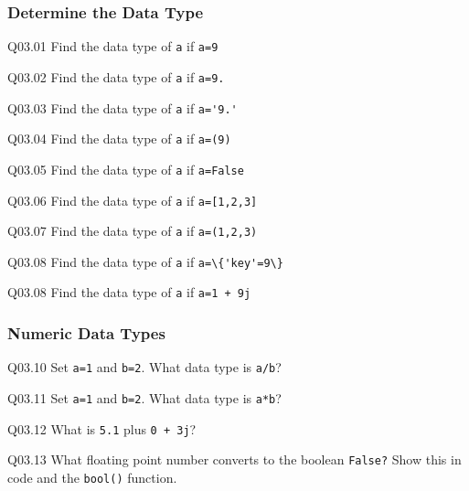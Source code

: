 \documentclass{book}
\newenvironment{problems}{}{}  %
\newcommand{\passthrough}[1]{#1}
\begin{document}
    
        \begin{problems}
        \hypertarget{determine-the-data-type}{%
\subsubsection{Determine the Data Type}\label{determine-the-data-type}}

Q03.01 Find the data type of \passthrough{\lstinline!a!} if
\passthrough{\lstinline!a=9!}

Q03.02 Find the data type of \passthrough{\lstinline!a!} if
\passthrough{\lstinline!a=9.!}

Q03.03 Find the data type of \passthrough{\lstinline!a!} if
\passthrough{\lstinline!a='9.'!}

Q03.04 Find the data type of \passthrough{\lstinline!a!} if
\passthrough{\lstinline!a=(9)!}

Q03.05 Find the data type of \passthrough{\lstinline!a!} if
\passthrough{\lstinline!a=False!}

Q03.06 Find the data type of \passthrough{\lstinline!a!} if
\passthrough{\lstinline!a=[1,2,3]!}

Q03.07 Find the data type of \passthrough{\lstinline!a!} if
\passthrough{\lstinline!a=(1,2,3)!}

Q03.08 Find the data type of \passthrough{\lstinline!a!} if
\passthrough{\lstinline!a=\{'key'=9\}!}

Q03.08 Find the data type of \passthrough{\lstinline!a!} if
\passthrough{\lstinline!a=1 + 9j!}
        \end{problems}

    




    
        \hypertarget{numeric-data-types}{%
\subsubsection{Numeric Data Types}\label{numeric-data-types}}

Q03.10 Set \passthrough{\lstinline!a=1!} and
\passthrough{\lstinline!b=2!}. What data type is
\passthrough{\lstinline!a/b!}?

Q03.11 Set \passthrough{\lstinline!a=1!} and
\passthrough{\lstinline!b=2!}. What data type is
\passthrough{\lstinline!a*b!}?

Q03.12 What is \passthrough{\lstinline!5.1!} plus
\passthrough{\lstinline!0 + 3j!}?

Q03.13 What floating point number converts to the boolean
\passthrough{\lstinline!False?!} Show this in code and the
\passthrough{\lstinline!bool()!} function.
\end{document}
